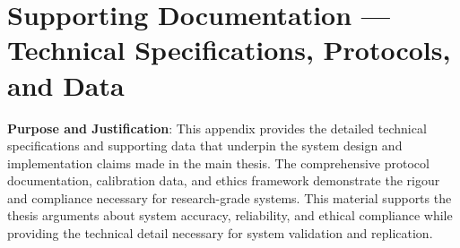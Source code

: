 \chapter{Supporting Documentation — Technical Specifications, Protocols, and Data}

\textbf{Purpose and Justification}: This appendix provides the detailed technical specifications and supporting data that underpin the system design and implementation claims made in the main thesis. The comprehensive protocol documentation, calibration data, and ethics framework demonstrate the rigour and compliance necessary for research-grade systems. This material supports the thesis arguments about system accuracy, reliability, and ethical compliance while providing the technical detail necessary for system validation and replication.

